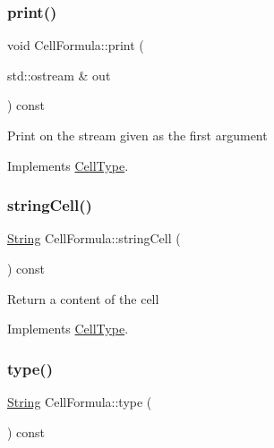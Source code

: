 \mbox{\label{class_cell_formula_ac8cfeff2585811ee01acb7a4ddf25723}} 
\subsubsection{\texorpdfstring{print()}{print()}}
{\footnotesize\ttfamily void Cell\+Formula\+::print (\begin{DoxyParamCaption}\item[{std\+::ostream \&}]{out }\end{DoxyParamCaption}) const\hspace{0.3cm}{\ttfamily [virtual]}}

Print on the stream given as the first argument 

Implements \hyperlink{class_cell_type_a34413fcb76f292b6b8d08615765ba894}{Cell\+Type}.

\mbox{\label{class_cell_formula_abe70a7ace4b58fe4154bacccb5e3c12c}} 
\subsubsection{\texorpdfstring{string\+Cell()}{stringCell()}}
{\footnotesize\ttfamily \hyperlink{class_string}{String} Cell\+Formula\+::string\+Cell (\begin{DoxyParamCaption}{ }\end{DoxyParamCaption}) const\hspace{0.3cm}{\ttfamily [virtual]}}

Return a content of the cell 

Implements \hyperlink{class_cell_type_abba4d6d43efa340144d1ad09637e1aa9}{Cell\+Type}.

\mbox{\label{class_cell_formula_ae175fd79ee036efa3a968f37b8eb53bc}} 
\subsubsection{\texorpdfstring{type()}{type()}}
{\footnotesize\ttfamily \hyperlink{class_string}{String} Cell\+Formula\+::type (\begin{DoxyParamCaption}{ }\end{DoxyParamCaption}) const\hspace{0.3cm}{\ttfamily [virtual]}}

